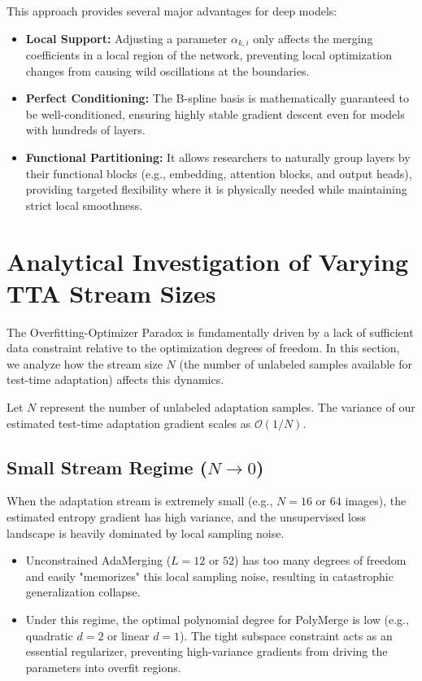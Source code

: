 This approach provides several major advantages for deep models:
\begin{itemize}
    \item \textbf{Local Support:} Adjusting a parameter $\alpha_{k, i}$ only affects the merging coefficients in a local region of the network, preventing local optimization changes from causing wild oscillations at the boundaries.
    \item \textbf{Perfect Conditioning:} The B-spline basis is mathematically guaranteed to be well-conditioned, ensuring highly stable gradient descent even for models with hundreds of layers.
    \item \textbf{Functional Partitioning:} It allows researchers to naturally group layers by their functional blocks (e.g., embedding, attention blocks, and output heads), providing targeted flexibility where it is physically needed while maintaining strict local smoothness.
\end{itemize}


\section{Analytical Investigation of Varying TTA Stream Sizes}
\label{sec:appendix_stream_size}

The Overfitting-Optimizer Paradox is fundamentally driven by a lack of sufficient data constraint relative to the optimization degrees of freedom. In this section, we analyze how the stream size $N$ (the number of unlabeled samples available for test-time adaptation) affects this dynamics.

Let $N$ represent the number of unlabeled adaptation samples. The variance of our estimated test-time adaptation gradient scales as $\mathcal{O}(1/N)$. 

\subsection{Small Stream Regime ($N \to 0$)}
When the adaptation stream is extremely small (e.g., $N=16$ or $64$ images), the estimated entropy gradient has high variance, and the unsupervised loss landscape is heavily dominated by local sampling noise. 
\begin{itemize}
    \item Unconstrained AdaMerging ($L=12$ or $52$) has too many degrees of freedom and easily "memorizes" this local sampling noise, resulting in catastrophic generalization collapse.
    \item Under this regime, the optimal polynomial degree for PolyMerge is low (e.g., quadratic $d=2$ or linear $d=1$). The tight subspace constraint acts as an essential regularizer, preventing high-variance gradients from driving the parameters into overfit regions.
\end{itemize}

